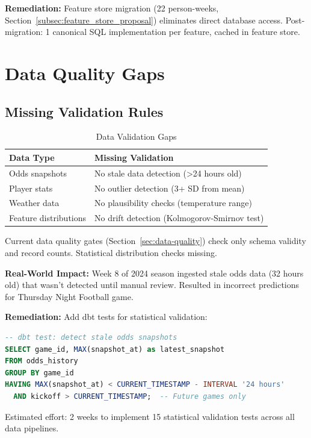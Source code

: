 \textbf{Remediation:} Feature store migration (22 person-weeks, Section~\ref{subsec:feature_store_proposal}) eliminates direct database access. Post-migration: 1 canonical SQL implementation per feature, cached in feature store.

\section{Data Quality Gaps}

\subsection{Missing Validation Rules}

\begin{table}[htbp]
\centering
\caption{Data Validation Gaps}
\label{tab:validation_gaps}
\begin{tabular}{@{}lp{8cm}@{}}
\toprule
\textbf{Data Type} & \textbf{Missing Validation} \\
\midrule
Odds snapshots & No stale data detection (>24 hours old) \\
Player stats & No outlier detection (3+ SD from mean) \\
Weather data & No plausibility checks (temperature range) \\
Feature distributions & No drift detection (Kolmogorov-Smirnov test) \\
\bottomrule
\end{tabular}
\end{table}

Current data quality gates (Section~\ref{sec:data-quality}) check only schema validity and record counts. Statistical distribution checks missing.

\textbf{Real-World Impact:} Week 8 of 2024 season ingested stale odds data (32 hours old) that wasn't detected until manual review. Resulted in incorrect predictions for Thursday Night Football game.

\textbf{Remediation:} Add dbt tests for statistical validation:
\begin{lstlisting}[language=SQL,basicstyle=\ttfamily\scriptsize,breaklines=true]
-- dbt test: detect stale odds snapshots
SELECT game_id, MAX(snapshot_at) as latest_snapshot
FROM odds_history
GROUP BY game_id
HAVING MAX(snapshot_at) < CURRENT_TIMESTAMP - INTERVAL '24 hours'
  AND kickoff > CURRENT_TIMESTAMP;  -- Future games only
\end{lstlisting}

Estimated effort: 2 weeks to implement 15 statistical validation tests across all data pipelines.

